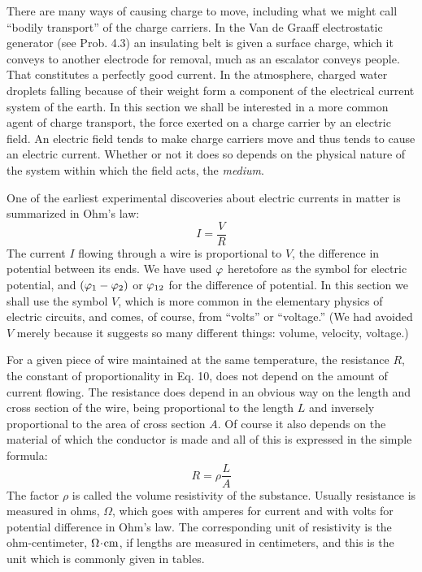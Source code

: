 There are many ways of causing charge to move, including what
we might call ``bodily transport'' of the charge carriers. In the
Van de Graaff electrostatic generator (see Prob. 4.3) an insulating
belt is given a surface charge, which it conveys to another electrode
for removal, much as an escalator conveys people. That constitutes
a perfectly good current. In the atmosphere, charged water droplets
falling because of their weight form a component of the electrical
current system of the earth. In this section we shall be interested in
a more common agent of charge transport, the force exerted on a
charge carrier by an electric field. An electric field tends to make
charge carriers move and thus tends to cause an electric current.
Whether or not it does so depends on the physical nature of the system
within which the field acts, the \emph{medium}.

One of the earliest experimental discoveries about electric currents
in matter is summarized in Ohm's law:
\begin{equation}
  I = \frac{V}{R}
\end{equation}
The current $I$ flowing through a wire is proportional to $V$, the difference
in potential between its ends. We have used $\varphi$ heretofore as
the symbol for electric potential, and $(\varphi_1-\varphi_2)$ or $\varphi_{12}$ for the difference
of potential. In this section we shall use the symbol $V$, which
is more common in the elementary physics of electric circuits, and
comes, of course, from ``volts'' or ``voltage.'' (We had avoided $V$
merely because it suggests so many different things: volume, velocity,
voltage.)

For a given piece of wire maintained at the same temperature, the
resistance $R$, the constant of proportionality in Eq. 10, does not depend
on the amount of current flowing. The resistance does depend
in an obvious way on the length and cross section of the wire, being
proportional to the length $L$ and inversely proportional to the area
of cross section $A$. Of course it also depends on the material of
which the conductor is made and all of this is expressed in the simple
formula:
\begin{equation}
  R = \rho \frac{L}{A}
\end{equation}
The factor $\rho$ is called the volume resistivity of the substance. Usually
resistance is measured in ohms, $\Omega$, which goes with amperes for current
and with volts for potential difference in Ohm's law. The corresponding
unit of resistivity is the ohm-centimeter, $\Omega\!\cdot\!\textup{cm}$, if lengths are measured
in centimeters, and this is the unit which is commonly given in tables.

